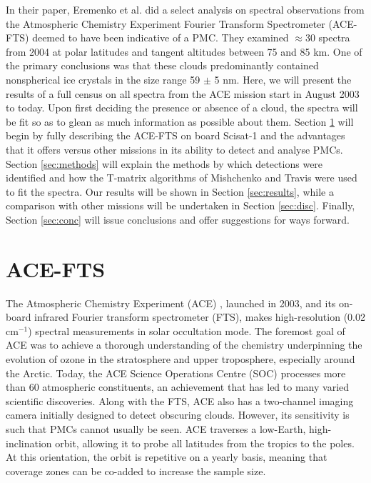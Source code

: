 \documentclass[]{elsarticle}
\begin{document}
In their paper, Eremenko et al. \cite{Eremenko2005} did a select analysis on spectral observations from the Atmospheric Chemistry Experiment Fourier Transform Spectrometer (ACE-FTS) deemed to have been indicative of a PMC. They examined $\approx$30 spectra from 2004 at polar latitudes and tangent altitudes between 75 and 85 km. One of the primary conclusions was that these clouds predominantly contained nonspherical ice crystals in the size range 59 $\pm$ 5 nm. 
Here, we will present the results of a full census on all spectra from the ACE mission start in August 2003 to today. Upon first deciding the presence or absence of a cloud, the spectra will be fit so as to glean as much information as possible about them. Section \ref{sec:instrument} will begin by fully describing the ACE-FTS on board Scisat-1 and the advantages that it offers versus other missions in its ability to detect and analyse PMCs. Section \ref{sec:methods} will explain the methods by which detections were identified and how the T-matrix algorithms of Mishchenko and Travis \cite{Mishchenko1998} were used to fit the spectra. Our results will be shown in Section \ref{sec:results}, while a comparison with other missions will be undertaken in Section \ref{sec:disc}. Finally, Section \ref{sec:conc} will issue conclusions and offer suggestions for ways forward.
\underline{}
\section{ACE-FTS} \label{sec:instrument}
The Atmospheric Chemistry Experiment (ACE) \cite{Bernath2017} \cite{Bernath2005}, launched in 2003, and its on-board infrared Fourier transform spectrometer (FTS), makes high-resolution (0.02 cm$^{-1}$) spectral measurements in solar occultation mode. The foremost goal of ACE was to achieve a thorough understanding of the chemistry underpinning the evolution of ozone in the stratosphere and upper troposphere, especially around the Arctic. Today, the ACE Science Operations Centre (SOC) processes more than 60 atmospheric constituents, an achievement that has led to many varied scientific discoveries. Along with the FTS, ACE also has a two-channel imaging camera \cite{Gilbert2007} initially designed to detect obscuring clouds. However, its sensitivity is such that PMCs cannot usually be seen. ACE traverses a low-Earth, high-inclination orbit, allowing it to probe all latitudes from the tropics to the poles. At this orientation, the orbit is repetitive on a yearly basis, meaning that coverage zones can be co-added to increase the sample size. 
\end{document}
